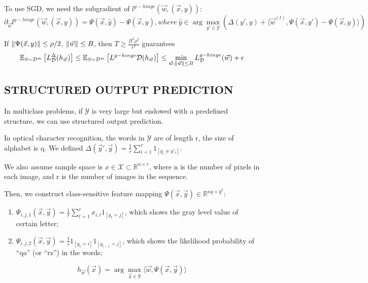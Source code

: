 To use SGD, we need the subgradient of $ l^{g-hinge}(\vec{w}, (\vec{x}, y)) $:
\[
    \partial_{\vec{w}} l^{g-hinge}(\vec{w}, (\vec{x}, y)) = \Psi(\vec{x}, \hat y) - \Psi(\vec{x}, y), where\
    \hat y \in \arg\max_{y' \in \mathcal{Y}} (\Delta(y', y) + \langle \vec{w}^{(t)}, \Psi(\vec{x}, y') - \Psi(\vec{x}, y) \rangle)
\]
\begin{corollary}
    If $ \Arrowvert \Psi(\vec{x}, y) \Arrowvert \le \rho/2 $, $ \Arrowvert \vec{w} \Arrowvert \le B $, then
    $ T \ge \frac{B^2\rho^2}{\epsilon^2}$ guarantees
    \[
        \mathbb{E}_{S\sim \mathcal{D}^m} \left[ L^\Delta_{\mathcal{D}}(h_{\vec{w}}) \right] \le \mathbb{E}_{S\sim \mathcal{D}^m} \left[ L^{g-hinge}{\mathcal{D}}(h_{\vec{w}}) \right] \le \min_{\vec{w}: \Arrowvert \vec{w} \Arrowvert \le B} L^{g-hinge}_{\mathcal{D}}(\vec{w}) + \epsilon
    \]
\end{corollary}

\subsection{STRUCTURED OUTPUT PREDICTION}%
\label{sub:structured_output_prediction}

In multiclass problems, if $ \mathcal{Y} $ is very large but endowed with a predefined structure, we can use structured output prediction.

In optical character recognition, the words in $ \mathcal{Y} $ are of length r, the size of alphabet is q. We defined $ \Delta(\vec{y}', \vec{y}) = \frac{1}{r} \sum^{r}_{i=1} 1_{[y_i \ne y'_i]} $.

We also assume sample space is $ x \in \mathcal{X} \subset \mathbb{R}^{n \times r} $, where n is the number of pixels in each image, and r is the number of images in the sequence.

Then, we construct class-sensitive feature mapping $ \Psi(\vec{x}, \vec{y}) \in \mathbb{R}^{nq + q^2} $:
\begin{enumerate}
    \item $ \Psi_{i, j, 1}(\vec{x}, \vec{y}) = \frac{1}{r} \sum^{r}_{t = 1} x_{i,t} 1_{[y_t = j]} $, which shows the gray level value of certain letter;
    \item $ \Psi_{i, j, 2}(\vec{x}, \vec{y}) = \frac{1}{r} 1_{[y_t = i]} 1_{[y_{t-1} = j]} $, which shows the likelihood probability of ``qa'' (or ``rz'') in the words;
\end{enumerate}
\[
    h_{\vec{w}}(\vec{x}) = \arg\max_{\vec{y} \in \mathcal{Y}} \langle \vec{w}, \Psi(\vec{x}, \vec{y}) \rangle
\]

